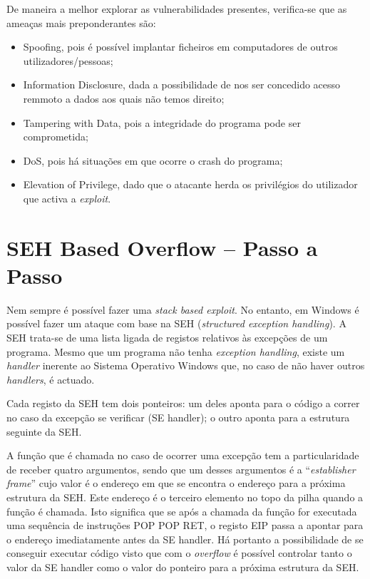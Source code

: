 \documentclass[a4paper]{article}
\begin{document}
De maneira a melhor explorar as vulnerabilidades presentes, verifica-se que as ameaças mais preponderantes são:

\begin{itemize}
        \item Spoofing, pois é possível implantar ficheiros em computadores de outros utilizadores/pessoas;
        \item Information Disclosure, dada a possibilidade de nos ser concedido acesso remmoto a dados aos quais não temos direito;
        \item Tampering with Data, pois a integridade do programa pode ser comprometida;
        \item DoS, pois há situações em que ocorre o crash do programa;
        \item Elevation of Privilege, dado que o atacante herda os privilégios do utilizador que activa a \textit{exploit}.
\end{itemize}

\section{SEH Based Overflow -- Passo a Passo}

Nem sempre é possível fazer uma \textit{stack based exploit}. No entanto, em Windows é possível fazer um ataque com base na SEH (\textit{structured exception handling}). A SEH trata-se de uma lista ligada de registos relativos às excepções de um programa. Mesmo que um programa não tenha \textit{exception handling}, existe um \textit{handler} inerente ao Sistema Operativo Windows que, no caso de não haver outros \textit{handlers}, é actuado.

Cada registo da SEH tem dois ponteiros: um deles aponta para o código a correr no caso da excepção se verificar (SE handler); o outro aponta para a estrutura seguinte da SEH.

A função que é chamada no caso de ocorrer uma excepção tem a particularidade de receber quatro argumentos, sendo que um desses argumentos é a ``\textit{establisher frame}'' cujo valor é o endereço em que se encontra o endereço para a próxima estrutura da SEH. Este endereço é o terceiro elemento no topo da pilha quando a função é chamada. Isto significa que se após a chamada da função for executada uma sequência de instruções POP POP RET, o registo EIP passa a apontar para o endereço imediatamente antes da SE handler. Há portanto a possibilidade de se conseguir executar código visto que com o \textit{overflow} é possível controlar tanto o valor da SE handler como o valor do ponteiro para a próxima estrutura da SEH.
\end{document}
